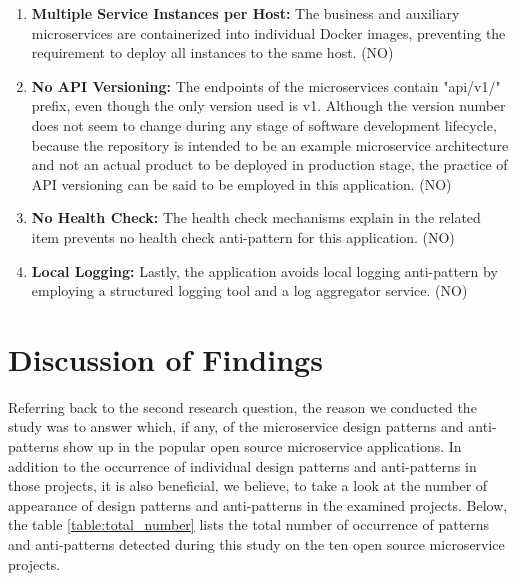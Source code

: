 \documentclass{Configuration_Files/PoliMi3i_thesis}
\begin{document}
\begin{enumerate}
    \item \textbf{Multiple Service Instances per Host:} The business and auxiliary microservices are containerized into individual Docker images, preventing the requirement to deploy all instances to the same host. (NO)
    
    \item \textbf{No API Versioning:} The endpoints of the microservices contain "api/v1/" prefix, even though the only version used is v1.
    Although the version number does not seem to change during any stage of software development lifecycle, because the repository is intended to be an example microservice architecture and not an actual product to be deployed in production stage, the practice of API versioning can be said to be employed in this application. (NO)
    
    \item \textbf{No Health Check:} The health check mechanisms explain in the related item prevents no health check anti-pattern for this application. (NO)
    
    \item \textbf{Local Logging:} Lastly, the application avoids local logging anti-pattern by employing a structured logging tool and a log aggregator service. (NO)
\end{enumerate}

\section{Discussion of Findings}
\label{sec:discussion}

Referring back to the second research question, the reason we conducted the study was to answer which, if any, of the microservice design patterns and anti-patterns show up in the popular open source microservice applications.
In addition to the occurrence of individual design patterns and anti-patterns in those projects, it is also beneficial, we believe, to take a look at the number of appearance of design patterns and anti-patterns in the examined projects.
Below, the table \ref{table:total_number} lists the total number of occurrence of patterns and anti-patterns detected during this study on the ten open source microservice projects.
\end{document}
